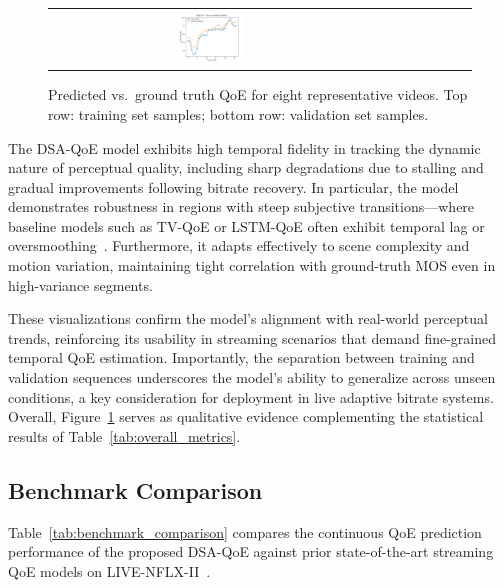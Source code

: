 \begin{figure}[h]
\begin{tabular}{@{}cccccccc@{}}
        \includegraphics[width=0.22\textwidth]{figures/validation/video_34_true_vs_predicted.png} \\
    \end{tabular}
    \caption{Predicted vs.~ground truth QoE for eight representative videos. Top row: training set samples; bottom row: validation set samples.}
    \label{fig:qoe_case_studies}
\end{figure}

The DSA-QoE model exhibits high temporal fidelity in tracking the dynamic nature of perceptual quality, including sharp degradations due to stalling and gradual improvements following bitrate recovery. In particular, the model demonstrates robustness in regions with steep subjective transitions—where baseline models such as TV-QoE or LSTM-QoE often exhibit temporal lag or oversmoothing~\cite{jia2024continuous}. Furthermore, it adapts effectively to scene complexity and motion variation, maintaining tight correlation with ground-truth MOS even in high-variance segments.

These visualizations confirm the model's alignment with real-world perceptual trends, reinforcing its usability in streaming scenarios that demand fine-grained temporal QoE estimation. Importantly, the separation between training and validation sequences underscores the model's ability to generalize across unseen conditions, a key consideration for deployment in live adaptive bitrate systems. Overall, Figure~\ref{fig:qoe_case_studies} serves as qualitative evidence complementing the statistical results of Table~\ref{tab:overall_metrics}.

\subsection{Benchmark Comparison}

Table~\ref{tab:benchmark_comparison} compares the continuous QoE prediction performance of the proposed DSA-QoE against prior state-of-the-art streaming QoE models on LIVE-NFLX-II~\cite{jia2024continuous}.

